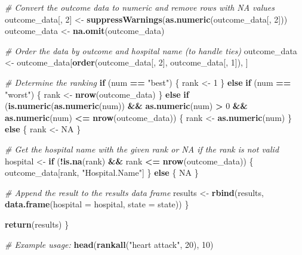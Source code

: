 \documentclass[
]{article}
\newenvironment{Shaded}{\begin{snugshade}}{\end{snugshade}}
\newcommand{\AttributeTok}[1]{\textcolor[rgb]{0.13,0.29,0.53}{#1}}
\newcommand{\CommentTok}[1]{\textcolor[rgb]{0.56,0.35,0.01}{\textit{#1}}}
\newcommand{\ConstantTok}[1]{\textcolor[rgb]{0.56,0.35,0.01}{#1}}
\newcommand{\ControlFlowTok}[1]{\textcolor[rgb]{0.13,0.29,0.53}{\textbf{#1}}}
\newcommand{\DecValTok}[1]{\textcolor[rgb]{0.00,0.00,0.81}{#1}}
\newcommand{\FunctionTok}[1]{\textcolor[rgb]{0.13,0.29,0.53}{\textbf{#1}}}
\newcommand{\NormalTok}[1]{#1}
\newcommand{\OtherTok}[1]{\textcolor[rgb]{0.56,0.35,0.01}{#1}}
\newcommand{\SpecialCharTok}[1]{\textcolor[rgb]{0.81,0.36,0.00}{\textbf{#1}}}
\newcommand{\StringTok}[1]{\textcolor[rgb]{0.31,0.60,0.02}{#1}}
\begin{document}
\begin{Shaded}
\begin{Highlighting}[]
    \CommentTok{\# Convert the outcome data to numeric and remove rows with NA values}
\NormalTok{    outcome\_data[, }\DecValTok{2}\NormalTok{] }\OtherTok{\textless{}{-}} \FunctionTok{suppressWarnings}\NormalTok{(}\FunctionTok{as.numeric}\NormalTok{(outcome\_data[, }\DecValTok{2}\NormalTok{]))}
\NormalTok{    outcome\_data }\OtherTok{\textless{}{-}} \FunctionTok{na.omit}\NormalTok{(outcome\_data)}
    
    \CommentTok{\# Order the data by outcome and hospital name (to handle ties)}
\NormalTok{    outcome\_data }\OtherTok{\textless{}{-}}\NormalTok{ outcome\_data[}\FunctionTok{order}\NormalTok{(outcome\_data[, }\DecValTok{2}\NormalTok{], outcome\_data[, }\DecValTok{1}\NormalTok{]), ]}
    
    \CommentTok{\# Determine the ranking}
    \ControlFlowTok{if}\NormalTok{ (num }\SpecialCharTok{==} \StringTok{"best"}\NormalTok{) \{}
\NormalTok{      rank }\OtherTok{\textless{}{-}} \DecValTok{1}
\NormalTok{    \} }\ControlFlowTok{else} \ControlFlowTok{if}\NormalTok{ (num }\SpecialCharTok{==} \StringTok{"worst"}\NormalTok{) \{}
\NormalTok{      rank }\OtherTok{\textless{}{-}} \FunctionTok{nrow}\NormalTok{(outcome\_data)}
\NormalTok{    \} }\ControlFlowTok{else} \ControlFlowTok{if}\NormalTok{ (}\FunctionTok{is.numeric}\NormalTok{(}\FunctionTok{as.numeric}\NormalTok{(num)) }\SpecialCharTok{\&\&} \FunctionTok{as.numeric}\NormalTok{(num) }\SpecialCharTok{\textgreater{}} \DecValTok{0} \SpecialCharTok{\&\&} \FunctionTok{as.numeric}\NormalTok{(num) }\SpecialCharTok{\textless{}=} \FunctionTok{nrow}\NormalTok{(outcome\_data)) \{}
\NormalTok{      rank }\OtherTok{\textless{}{-}} \FunctionTok{as.numeric}\NormalTok{(num)}
\NormalTok{    \} }\ControlFlowTok{else}\NormalTok{ \{}
\NormalTok{      rank }\OtherTok{\textless{}{-}} \ConstantTok{NA}
\NormalTok{    \}}
    
    \CommentTok{\# Get the hospital name with the given rank or NA if the rank is not valid}
\NormalTok{    hospital }\OtherTok{\textless{}{-}} \ControlFlowTok{if}\NormalTok{ (}\SpecialCharTok{!}\FunctionTok{is.na}\NormalTok{(rank) }\SpecialCharTok{\&\&}\NormalTok{ rank }\SpecialCharTok{\textless{}=} \FunctionTok{nrow}\NormalTok{(outcome\_data)) \{}
\NormalTok{      outcome\_data[rank, }\StringTok{"Hospital.Name"}\NormalTok{]}
\NormalTok{    \} }\ControlFlowTok{else}\NormalTok{ \{}
      \ConstantTok{NA}
\NormalTok{    \}}
    
    \CommentTok{\# Append the result to the results data frame}
\NormalTok{    results }\OtherTok{\textless{}{-}} \FunctionTok{rbind}\NormalTok{(results, }\FunctionTok{data.frame}\NormalTok{(}\AttributeTok{hospital =}\NormalTok{ hospital, }\AttributeTok{state =}\NormalTok{ state))}
\NormalTok{  \}}
  
  \FunctionTok{return}\NormalTok{(results)}
\NormalTok{\}}

\CommentTok{\# Example usage:}
\FunctionTok{head}\NormalTok{(}\FunctionTok{rankall}\NormalTok{(}\StringTok{"heart attack"}\NormalTok{, }\DecValTok{20}\NormalTok{), }\DecValTok{10}\NormalTok{)}
\end{Highlighting}
\end{Shaded}
\end{document}
